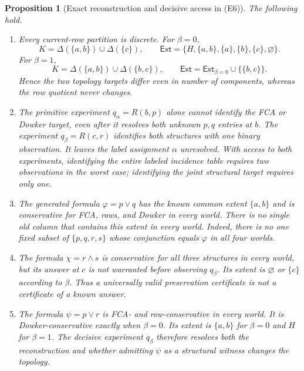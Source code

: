 \documentclass[11pt]{article}
\newtheorem{proposition}[theorem]{Proposition}
\theoremstyle{definition}
\newcommand{\Ext}{\mathsf{Ext}}
\begin{document}
\begin{proposition}[Exact reconstruction and decisive access in (E6)]\label{prop:example}
The following hold.
\begin{enumerate}[label=(\roman*)]
\item Every current-row partition is discrete. For $\beta=0$,
\[
 K=\Delta(\{a,b\})\cup\Delta(\{c\}),\qquad
 \Ext=\{H,\{a,b\},\{a\},\{b\},\{c\},\varnothing\}.
\]
For $\beta=1$,
\[
 K=\Delta(\{a,b\})\cup\Delta(\{b,c\}),\qquad
 \Ext=\Ext_{\beta=0}\cup\{\{b,c\}\}.
\]
Hence the two topology targets differ even in number of components, whereas the row quotient never changes.
\item The primitive experiment $q_\alpha=R(b,p)$ alone cannot identify the FCA or Dowker target, even after it resolves both unknown $p,q$ entries at $b$. The experiment $q_\beta=R(c,r)$ identifies both structures with one binary observation. It leaves the label assignment $\alpha$ unresolved. With access to both experiments, identifying the entire labeled incidence table requires two observations in the worst case; identifying the joint structural target requires only one.
\item The generated formula $\varphi=p\vee q$ has the known common extent $\{a,b\}$ and is conservative for FCA, rows, and Dowker in every world. There is no single old column that contains this extent in every world. Indeed, there is no one fixed subset of $\{p,q,r,s\}$ whose conjunction equals $\varphi$ in all four worlds.
\item The formula $\chi=r\wedge s$ is conservative for all three structures in every world, but its answer at $c$ is not warranted before observing $q_\beta$. Its extent is $\varnothing$ or $\{c\}$ according to $\beta$. Thus a universally valid preservation certificate is not a certificate of a known answer.
\item The formula $\psi=p\vee r$ is FCA- and row-conservative in every world. It is Dowker-conservative exactly when $\beta=0$. Its extent is $\{a,b\}$ for $\beta=0$ and $H$ for $\beta=1$. The decisive experiment $q_\beta$ therefore resolves both the reconstruction and whether admitting $\psi$ as a structural witness changes the topology.
\end{enumerate}
\end{proposition}
\end{document}
